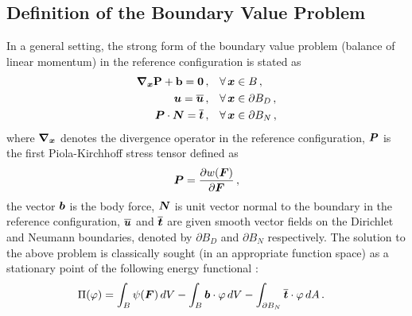 \subsection{Definition of the Boundary Value Problem}\label{subsec:def-NBVP}

In a general setting, the strong form of the boundary value problem (balance of linear momentum) in the reference configuration is stated as \cite{wriggers2008nonlinear}
\begin{align}
    \boldsymbol{\nabla}_{\boldsymbol{x}} \bf{P} + \bf{b}  = {\bf{0}}\,,& \quad \forall\,\boldsymbol{x} \in {B}\,, \label{eq: stress divergence}\\
    \boldsymbol{u} = \overline{\boldsymbol{u}}\,,& \quad \forall\, \boldsymbol{x} \in \partial B_D\,,\\
    \boldsymbol{P} \cdot \boldsymbol{N} = \overline{\boldsymbol{t}}\,,& \quad \forall\, \boldsymbol{x} \in \partial B_N\,,
\end{align}
where $\boldsymbol{\nabla}_{\boldsymbol{x}}$ denotes the divergence operator in the reference configuration, $\boldsymbol{P}$ is the first Piola-Kirchhoff stress tensor defined as
\begin{equation}
    \boldsymbol{P} = \displaystyle{\frac{\partial w(\boldsymbol{F})}{\partial \boldsymbol{F}}}\,,
\end{equation}
the vector $\boldsymbol{b}$ is the body force, $\boldsymbol{N}$ is unit vector normal to the boundary in the reference configuration, $\overline{\boldsymbol{u}}$ and $\overline{\boldsymbol{t}}$ are given smooth vector fields on the Dirichlet and Neumann boundaries, denoted by $\partial B_D$ and $\partial B_N$ respectively. The solution to the above problem is classically sought (in an appropriate function space) as a stationary point of the following energy functional \cite{wriggers2008nonlinear}:
\begin{align}
    \Pi(\varphi) &= \int_B \psi(\boldsymbol{F}) \, dV - \int_{B} \boldsymbol{b} \cdot \varphi\,dV - \int_{\partial B_N} \overline{\boldsymbol{t}} \cdot \varphi\,dA\,.
\end{align}